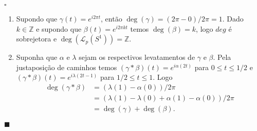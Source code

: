 \documentclass[12pt]{book}
\newenvironment{prova}[1]{$\square$ #1}{\hfill$\blacksquare$}
\newcommand{\caminhos}{\mathcal{L}}
\newcommand{\caminhospontobasegeral}[2]{\caminhos_{#1}(#2)}
\newcommand{\circulo}{S^{1}}
\newcommand{\inteiros}{\mathbb{Z}}
\begin{document}
	\begin{prova}
		\begin{enumerate}
			\item Supondo que $\gamma(t) = e^{i2\pi t}$, então $\deg(\gamma) = (2\pi -0)/2\pi =1$. Dado $k \in \inteiros$ e supondo que $\beta(t) = e^{i2\pi kt}$ temos $\deg(\beta) = k$, logo $deg$ é sobrejetora e $\deg(\caminhospontobasegeral{p}{\circulo}) = \inteiros$.
			
			\item Suponha que $\alpha$ e $\lambda$ sejam os respectivos levatamentos de $\gamma$ e $\beta$. Pela justaposição de caminhos temos $(\gamma*\beta)(t) = e^{i\alpha(2t)}$ para $0\leq t\leq 1/2$ e  $(\gamma*\beta)(t) = e^{i\lambda(2t - 1)}$ para $1/2\leq t\leq 1$. Logo 
			$$
			\begin{aligned}
			\deg(\gamma*\beta) &= (\lambda(1)- \alpha(0))/2\pi 
			\\
			&= (\lambda(1) -\lambda(0)+ \alpha(1)- \alpha(0))/2\pi
			\\
			&= \deg(\gamma)+\deg(\beta).
			\end{aligned}
			$$  
						

\end{enumerate}
\end{prova}
\end{document}
